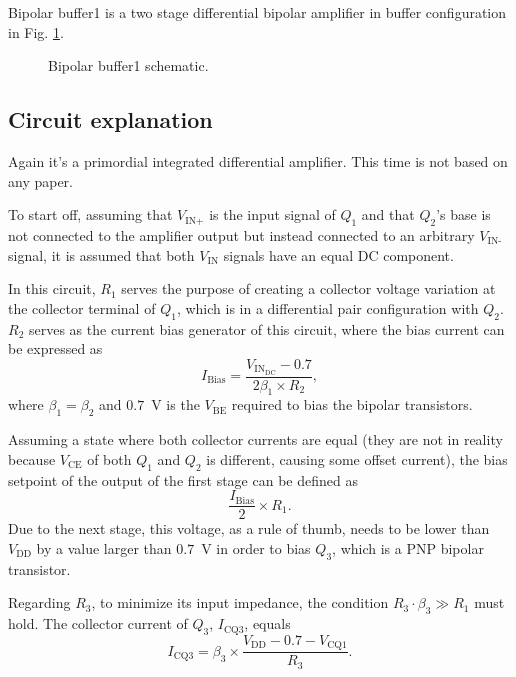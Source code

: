 \documentclass[12pt]{article}
\begin{document}
Bipolar buffer1 is a two stage differential bipolar amplifier in buffer configuration in Fig. \ref{bipolarbuffer01}. 

\begin{figure}[H]
        \centering
        
        \caption{Bipolar buffer1  schematic.}
        \label{bipolarbuffer01}
\end{figure}

\subsection{Circuit explanation}


Again it's a primordial integrated differential amplifier. This time is not based on any paper.

To start off, assuming that $V_{\text{IN+}}$ is the input signal of $Q_1$ and that $Q_2$'s base is not connected to the amplifier output but instead connected to an arbitrary $V_{\text{IN-}}$ signal, it is assumed that both $V_{\text{IN}}$ signals have an equal DC component.

In this circuit, $R_1$ serves the purpose of creating a collector voltage variation at the collector terminal of $Q_1$, which is in a differential pair configuration with $Q_2$. $R_2$ serves as the current bias generator of this circuit, where the bias current can be expressed as  
\begin{equation}
    I_{\text{Bias}} = \frac{V_{\text{IN}_{\text{DC}}} - 0.7}{2 \beta_{1} \times R_2},
\end{equation}  
where $\beta_1 = \beta_2$ and $0.7$~V is the $V_{\text{BE}}$ required to bias the bipolar transistors.  

Assuming a state where both collector currents are equal (they are not in reality because $V_{\text{CE}}$ of both $Q_1$ and $Q_2$ is different, causing some offset current), the bias setpoint of the output of the first stage can be defined as  
\[
\frac{I_{\text{Bias}}}{2} \times R_1.
\]  
Due to the next stage, this voltage, as a rule of thumb, needs to be lower than $V_{\text{DD}}$ by a value larger than $0.7$~V in order to bias $Q_3$, which is a PNP bipolar transistor.  

Regarding $R_3$, to minimize its input impedance, the condition $R_3 \cdot \beta_3 \gg R_1$ must hold. The collector current of $Q_3$, $I_{\text{CQ3}}$, equals  
\[
I_{\text{CQ3}} = \beta_3 \times \frac{V_{\text{DD}} - 0.7 - V_{\text{CQ1}}}{R_3}.
\]  
\end{document}
